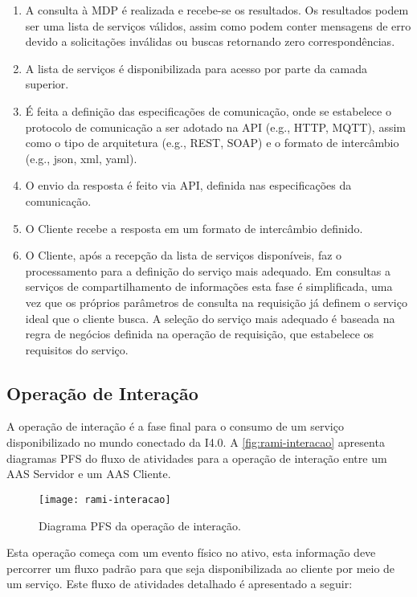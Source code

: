 	\begin{enumerate}
		\item A consulta à MDP é realizada e recebe-se os resultados. Os resultados podem ser uma lista de serviços válidos, assim como podem conter mensagens de erro devido a solicitações inválidas ou buscas retornando zero correspondências.
		\item A lista de serviços é disponibilizada para acesso por parte da camada superior.
		\item É feita a definição das especificações de comunicação, onde se estabelece o protocolo de comunicação a ser adotado na API (e.g., HTTP, MQTT), assim como o tipo de arquitetura (e.g., REST, SOAP) e o formato de intercâmbio (e.g., json, xml, yaml).
		\item O envio da resposta é feito via API, definida nas especificações da comunicação.
		\item O Cliente recebe a resposta em um formato de intercâmbio definido.
		\item O Cliente, após a recepção da lista de serviços disponíveis, faz o processamento para a definição do serviço mais adequado. Em consultas a serviços de compartilhamento de informações esta fase é simplificada, uma vez que os próprios parâmetros de consulta na requisição já definem o serviço ideal que o cliente busca. A seleção do serviço mais adequado é baseada na regra de negócios definida na operação de requisição, que estabelece os requisitos do serviço.
	\end{enumerate}

\subsection{Operação de Interação}

	A operação de interação é a fase final para o consumo de um serviço disponibilizado no mundo conectado da I4.0. A \autoref{fig:rami-interacao} apresenta diagramas PFS do fluxo de atividades para a operação de interação entre um AAS Servidor e um AAS Cliente.
	
	\begin{figure}[htb]
		\centering
		\caption{Diagrama PFS da operação de interação.}
		\label{fig:rami-interacao}
		\texttt{[image: rami-interacao]}
	\end{figure}

	Esta operação começa com um evento físico no ativo, esta informação deve percorrer um fluxo padrão para que seja disponibilizada ao cliente por meio de um serviço. Este fluxo de atividades detalhado é apresentado a seguir:
	
